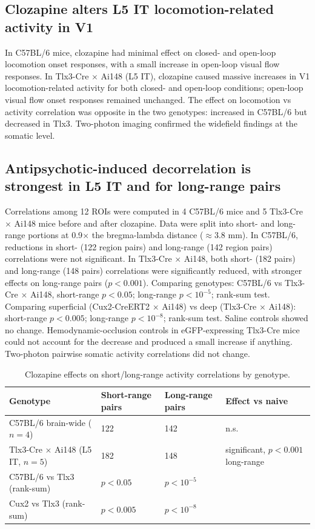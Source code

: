 \documentclass[11pt]{article}
\begin{document}
\subsection{Clozapine alters L5 IT locomotion-related activity in V1}
In C57BL/6 mice, clozapine had minimal effect on closed- and open-loop locomotion onset responses, with a small increase in open-loop visual flow responses. In Tlx3-Cre $\times$ Ai148 (L5 IT), clozapine caused massive increases in V1 locomotion-related activity for both closed- and open-loop conditions; open-loop visual flow onset responses remained unchanged. The effect on locomotion vs activity correlation was opposite in the two genotypes: increased in C57BL/6 but decreased in Tlx3. Two-photon imaging confirmed the widefield findings at the somatic level.

\subsection{Antipsychotic-induced decorrelation is strongest in L5 IT and for long-range pairs}
Correlations among 12 ROIs were computed in 4 C57BL/6 mice and 5 Tlx3-Cre $\times$ Ai148 mice before and after clozapine. Data were split into short- and long-range portions at 0.9$\times$ the bregma-lambda distance ($\approx$3.8 mm). In C57BL/6, reductions in short- (122 region pairs) and long-range (142 region pairs) correlations were not significant. In Tlx3-Cre $\times$ Ai148, both short- (182 pairs) and long-range (148 pairs) correlations were significantly reduced, with stronger effects on long-range pairs ($p < 0.001$). Comparing genotypes: C57BL/6 vs Tlx3-Cre $\times$ Ai148, short-range $p < 0.05$; long-range $p < 10^{-5}$; rank-sum test. Comparing superficial (Cux2-CreERT2 $\times$ Ai148) vs deep (Tlx3-Cre $\times$ Ai148): short-range $p < 0.005$; long-range $p < 10^{-8}$; rank-sum test. Saline controls showed no change. Hemodynamic-occlusion controls in eGFP-expressing Tlx3-Cre mice could not account for the decrease and produced a small increase if anything. Two-photon pairwise somatic activity correlations did not change.

\begin{table}[h]
\centering
\caption{Clozapine effects on short/long-range activity correlations by genotype.}
\begin{tabular}{llll}
\toprule
Genotype & Short-range pairs & Long-range pairs & Effect vs naive \\
\midrule
C57BL/6 brain-wide ($n=4$) & 122 & 142 & n.s. \\
Tlx3-Cre $\times$ Ai148 (L5 IT, $n=5$) & 182 & 148 & significant, $p < 0.001$ long-range \\
C57BL/6 vs Tlx3 (rank-sum) & $p < 0.05$ & $p < 10^{-5}$ & \\
Cux2 vs Tlx3 (rank-sum) & $p < 0.005$ & $p < 10^{-8}$ & \\
\bottomrule
\end{tabular}
\end{table}
\end{document}
